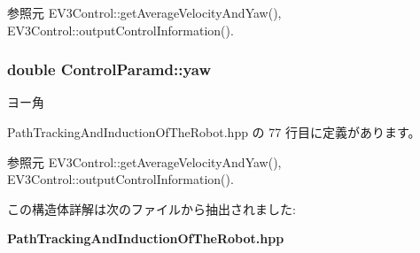 参照元 E\-V3\-Control\-::get\-Average\-Velocity\-And\-Yaw(), E\-V3\-Control\-::output\-Control\-Information().

\subsubsection[{yaw}]{\setlength{\rightskip}{0pt plus 5cm}double Control\-Paramd\-::yaw}\label{struct_control_paramd_afe46f0c7d9c364ac6ecddd5aee320c25}


ヨー角 



 Path\-Tracking\-And\-Induction\-Of\-The\-Robot.\-hpp の 77 行目に定義があります。



参照元 E\-V3\-Control\-::get\-Average\-Velocity\-And\-Yaw(), E\-V3\-Control\-::output\-Control\-Information().



この構造体詳解は次のファイルから抽出されました\-:\begin{DoxyCompactItemize}
\item 
{\bf Path\-Tracking\-And\-Induction\-Of\-The\-Robot.\-hpp}\end{DoxyCompactItemize}
